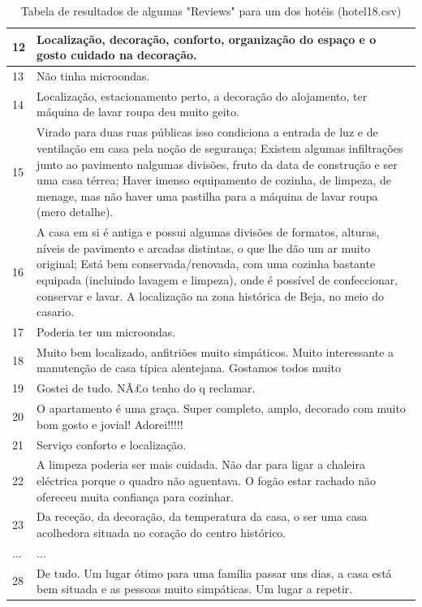 \documentclass[a4paper,10pt]{article}
\begin{document}
\begin{table}[!ht]
\begin{tabular}{|p{}|p{}|}
      12 & Localização, decoração, conforto, organização do espaço e o gosto cuidado na decoração. \\ \hline
      13 & Não tinha microondas. \\ \hline
      14 & Localização, estacionamento perto, a decoração do alojamento, ter máquina de lavar roupa deu muito geito. \\ \hline
      15 & Virado para duas ruas públicas isso condiciona a entrada de luz e de ventilação em casa pela noção de segurança; 
      Existem algumas infiltrações junto ao pavimento nalgumas divisões, fruto da data de construção e ser uma casa térrea;
      Haver imenso equipamento de cozinha, de limpeza, de menage, mas não haver uma pastilha para a máquina de lavar roupa (mero detalhe).
      \\ \hline
      16 & A casa em si é antiga e possui algumas divisões de formatos, alturas, níveis de pavimento e arcadas distintas, o que lhe dão um ar muito original;
      Está bem conservada/renovada, com uma cozinha bastante equipada (incluindo lavagem e limpeza), onde é possível de confeccionar, conservar e lavar. 
      A localização na zona histórica de Beja, no meio do casario.
      \\ \hline
      17 & Poderia ter um microondas. \\ \hline
      18 & Muito bem localizado, anfitriões muito simpáticos.
      Muito interessante a manutenção de casa típica alentejana.
      Gostamos todos muito
      \\ \hline
      19 & Gostei de tudo. NÃ£o tenho do q reclamar. \\ \hline
      20 & O apartamento é uma graça. Super completo, amplo, decorado com muito bom gosto e jovial! Adorei!!!!! \\ \hline
      21 & Serviço conforto e localização. \\ \hline
      22 & A limpeza poderia ser mais cuidada. Não dar para ligar a chaleira eléctrica porque o quadro não aguentava. O fogão estar rachado não ofereceu muita confiança para cozinhar. \\ \hline
      23 & Da receção, da decoração, da temperatura da casa, o ser uma casa acolhedora situada no coração do centro histórico. \\ \hline
      ... & ...\\ \hline
      28 & De tudo. Um lugar ótimo para uma família passar uns dias, a casa está bem situada e as pessoas muito simpáticas. Um lugar a repetir.  \\ \hline
      
    \end{tabular}
        \caption{Tabela de resultados de algumas "Reviews" para um dos hotéis (hotel18.csv)}
\end{table}
\end{document}
